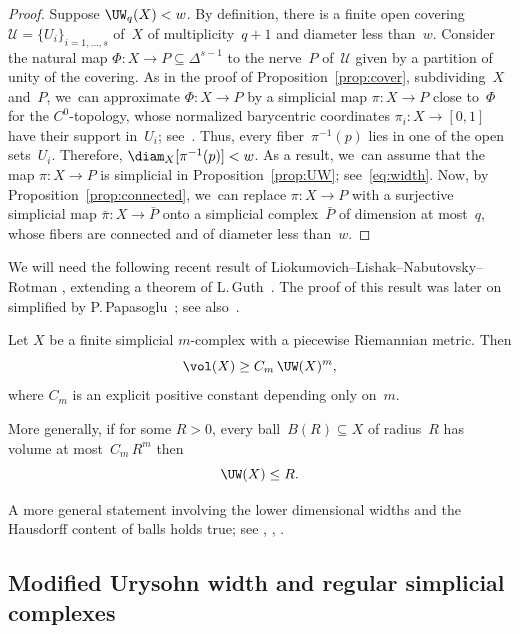 \begin{proof}
Suppose $\UW_q(X) < w$.
By definition, there is a finite open covering~$\mathcal{U} = \{U_i\}_{i=1,\dots, s}$ of~$X$ of multiplicity~$q+1$ and diameter less than~$w$.
Consider the natural map $\Phi:X \to P \subseteq \Delta^{s-1}$ to the nerve~$P$ of~$\mathcal{U}$ given by a partition of unity of the covering.
As in the proof of Proposition~\ref{prop:cover}, subdividing~$X$ and~$P$, we~can approximate $\Phi:X \to P$ by a simplicial map $\pi:X \to P$ close to~$\Phi$ for the $C^0$-topology, whose normalized barycentric coordinates $\pi_i:X \to [0,1]$ have their support in~$U_i$; see~\cite[\S2.C]{hatcher}.
Thus, every fiber~$\pi^{-1}(p)$ lies in one of the open sets~$U_i$.
Therefore, $\diam_X [\pi^{-1}(p)] < w$.
As a result, we~can assume that the map $\pi:X \to P$ is simplicial in Proposition~\ref{prop:UW}; see~\eqref{eq:width}.
Now, by Proposition~\ref{prop:connected}, we~can replace $\pi:X \to P$ with a surjective simplicial map $\bar{\pi}:X \to \bar{P}$ onto a simplicial complex~$\bar{P}$ of dimension at most~$q$, whose fibers are connected and of diameter less than~$w$.
\end{proof}

We will need the following recent result of Liokumovich--Lishak--Nabutovsky--Rot\-man \cite{LLNR}, extending a theorem of L.\,Guth~\cite{Guth17}.
The proof of this result was later on simplified by P.\,Papasoglu~\cite{Pap}; see also~\cite{Nab}.

\begin{theorem} \label{theo:width}
Let $X$ be a finite simplicial $m$\nobreakdash-complex with a piecewise Riemannian metric.
Then
\[
\vol(X) \geq C_m \, \UW(X)^m,
\]
where $C_m$ is an explicit positive constant depending only on~$m$.

More generally, if for some $R>0$, every ball~$B(R) \subseteq X$ of radius~$R$ has volume at most~$C_m \, R^m$ then
\[
\UW(X) \leq R.
\]
\end{theorem}

A more general statement involving the lower dimensional widths and the Hausdorff content of balls holds true; see \cite{LLNR}, \cite{Pap}, \cite{Nab}.

\subsection{Modified Urysohn width and regular simplicial complexes}

